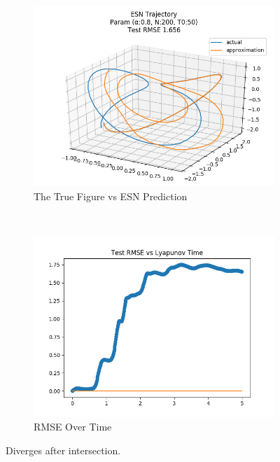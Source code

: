 \documentclass{article}
\begin{document}
\begin{figure}[H]
    \centering
    \begin{subfigure}[b]{0.45\textwidth}
        \includegraphics[width=\textwidth]{doc/paper/images/lorenz/rank_6_param_222_fit.png}
        \caption{The True Figure vs ESN Prediction}
        \label{fig:lorenz_r6_fit}
    \end{subfigure}
    ~
    \begin{subfigure}[b]{0.45\textwidth}
        \includegraphics[width=\textwidth]{doc/paper/images/lorenz/rank_6_param_222_rmse.png}
        \caption{RMSE Over Time}
        \label{fig:lorenz_r6_rmse}
    \end{subfigure}
    \caption{Diverges after intersection.}
    \label{fig:lorenz_r6}
\end{figure}
\end{document}
